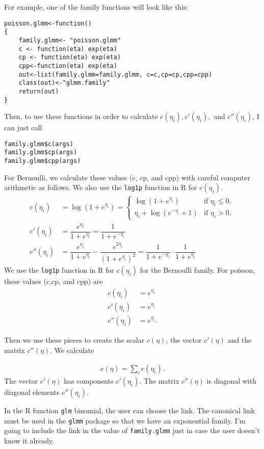\documentclass{article}
\begin{document}
For example, one of the family functions will look like this:
\begin{verbatim}
poisson.glmm<-function()
{
	family.glmm<- "poisson.glmm"
	c <- function(eta) exp(eta)
	cp <- function(eta) exp(eta)
	cpp<-function(eta) exp(eta)
	out<-list(family.glmm=family.glmm, c=c,cp=cp,cpp=cpp)
	class(out)<-"glmm.family"
	return(out)
}
\end{verbatim}

Then, to use these functions in order to calculate $c(\eta_i), c'(\eta_i),$ and  $c''(\eta_i)$, I can just call 
\begin{verbatim}
family.glmm$c(args)
family.glmm$cp(args)
family.glmm$cpp(args)
\end{verbatim}

For  Bernoulli, we calculate these values (c, cp, and cpp) with careful computer arithmetic as follows. We also use the \texttt{log1p} function in R for $c(\eta_i)$. 
\begin{align}
c(\eta_i) &= \log(1+e^{\eta_i}) =
  \begin{cases}
    \log(1+e^{\eta_i}) & \text{if } \eta_i\leq 0,\\
    \eta_i+\log(e^{-\eta_i}+1) & \text{if } \eta_i >0,
  \end{cases}\\
c'(\eta_i)&=\dfrac{ e^{{\eta_{i}}}}{ 1+e^{{\eta_{i}}}} = \dfrac{1}{1+e^{-\eta_i}}\\
c''(\eta_i)&=   \dfrac{e^{{\eta_{i}}}}{  1+ e^{{\eta_{i}}} }  - \dfrac{e^{2{\eta_{i}}}}{    (  1+ e^{{\eta_{i}}})^2}  = \dfrac{1}{1+e^{-\eta_i}}\cdot \dfrac{1}{1+e^{\eta_i}}
\end{align}
We use the \texttt{log1p} function in R for $c(\eta_i)$ for the Bernoulli family. For poisson, these values (c,cp, and cpp) are
\begin{align}
c(\eta_i)&=e^{\eta_i}\\
c'(\eta_i)&=e^{{\eta_{i}}}\\
c''(\eta_i)&= e^{{\eta_{i}}}.
\end{align}

Then we use these pieces to create the scalar $c(\eta)$, the vector $c'(\eta)$ and the matrix $c''(\eta)$. We calculate

\begin{align}
c(\eta)= \sum_i c(\eta_i).
\end{align}
 The vector $c'(\eta)$ has components $c'(\eta_i)$. The matrix $c''(\eta)$ is diagonal with diagonal elements $c''(\eta_i)$.

In the R function \texttt{glm} binomial, the user can choose the link. The canonical link must be used in the \texttt{glmm} package so that we have an exponential family. I'm going to include the link in the value of \texttt{family.glmm} just in case the user doesn't know it already.
\end{document}
